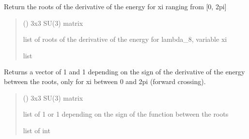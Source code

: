 \documentclass[letterpaper,10pt,english]{sphinxmanual}
\begin{document}
\begin{fulllineitems}
\label{\detokenize{numerical_reject:numerical_reject.roots_xi}}
\pysigstartsignatures
\pysiglinewithargsret
{}
{}
{}
\pysigstopsignatures
\sphinxAtStartPar
Return the roots of the derivative of the energy for xi ranging from {[}0, 2pi{]}
\begin{quote}\begin{description}
\sphinxAtStartPar
{} () \textendash{} 3x3 SU(3) matrix

\sphinxAtStartPar
list of roots of the derivative of the energy for lambda\_8, variable xi

\sphinxAtStartPar
list

\end{description}\end{quote}

\end{fulllineitems}


\begin{fulllineitems}
\label{\detokenize{numerical_reject:numerical_reject.signe_entre_racines}}
\pysigstartsignatures
\pysiglinewithargsret
{}
{}
{}
\pysigstopsignatures
\sphinxAtStartPar
Returns a vector of \sphinxhyphen{}1 and 1 depending on the sign of the derivative of the energy between the roots, only for xi between 0 and 2pi (forward crossing).
\begin{quote}\begin{description}
\sphinxAtStartPar
{} () \textendash{} 3x3 SU(3) matrix

\sphinxAtStartPar
list of 1 or \sphinxhyphen{}1 depending on the sign of the function between the roots

\sphinxAtStartPar
list of int

\end{description}\end{quote}

\end{fulllineitems}
\end{document}
